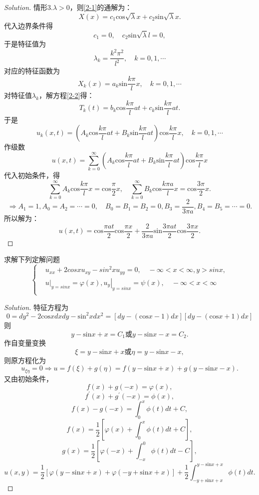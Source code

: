 \documentclass[cn,hazy,blue,14pt,screen]{elegantnote}
\begin{document}
\begin{example}
\begin{proof}[Solution]
		情形3.\quad $\lambda>0$，则\eqref{2-1}的通解为：
		$$X(x)=c_1\mathrm{cos}\sqrt{\lambda}x+c_2\mathrm{sin}\sqrt{\lambda}x.$$
		代入边界条件得
		$$c_1=0,\quad c_2\mathrm{sin}\sqrt{\lambda}l=0,$$
		于是特征值为
		$$\lambda_k=\frac{k^2\pi^2}{l^2},\quad k=0,1,\cdots$$
		对应的特征函数为
		$$X_k(x)=a_k\mathrm{sin}\frac{k\pi}{l} x,\quad k=0,1,\cdots$$
		对特征值$\lambda_k$，解方程\eqref{2-2}得：
		$$T_k(t)=b_k\mathrm{cos}\frac{k\pi}{l} at+c_k 
		\mathrm{sin}\frac{k\pi}{l} at.$$
		于是
		$$u_k(x,t)=\left(A_k\mathrm{cos}\frac{k\pi}{l} at
		+B_k\mathrm{sin}\frac{k\pi}{l} at\right)\mathrm{cos}\frac{k\pi}{l} 
		x,\quad k=0,1,\cdots$$
		作级数
		$$u(x,t)=\sum_{k=0}^{\infty}\left(A_k\mathrm{cos}\frac{k\pi}{l} at
		+B_k\mathrm{sin}\frac{k\pi}{l} at\right)\mathrm{cos}\frac{k\pi}{l} 
		x$$
		代入初始条件，得
		$$\sum_{k=0}^{\infty}A_k\mathrm{cos}\frac{k\pi}{l} 
		x=\mathrm{cos}\frac{\pi}{2}x,\quad \sum_{k=0}^{\infty}B_k\mathrm{cos}\frac{k\pi a}{l} x=\mathrm{cos}\frac{3\pi}{2}x.$$	
		$$\Rightarrow A_1=1,A_0=A_2=\cdots=0,\quad B_0=B_1=B_2=0,B_3=\frac{2}{3\pi 
			a},B_4=B_5=\cdots=0.$$
		所以解为：
		$$u(x,t)=\mathrm{cos}\frac{\pi at}{2}\mathrm{cos}\frac{\pi 
			x}{2}+\frac{2}{3\pi a}\mathrm{sin}\frac{3\pi at}{2}\mathrm{cos}\frac{3\pi 
			x}{2}.
		$$
	\end{proof}
	\end{example}
		
	\begin{example}
		求解下列定解问题
		\begin{equation*}
		\left\{\begin{aligned}
			&u_{xx}+2cosxu_{xy}-sin^{2}xu_{yy}=0, \quad -\infty<x<\infty, 
			y>sinx,  \\
			&\left.u\right|_{y=sinx}=\varphi(x), 
			\left.u_{y}\right|_{y=sinx}=\psi(x), \quad -\infty<x<\infty \\
		\end{aligned}\right.
		\end{equation*}
		\begin{proof}[Solution]
			特征方程为
			$$0=dy^2-2\mathrm{cos}xdxdy-\mathrm{sin}^2xdx^2
			=[dy-(\mathrm{cos}x-1)dx][dy-(\mathrm{cos}x+1)dx]$$
			则
			$$y-\mathrm{sin}x+x=C_1\text{或}y-\mathrm{sin}x-x=C_2.$$
			作自变量变换
			$$\xi=y-\mathrm{sin}x+x\text{或}\eta=y-\mathrm{sin}x-x,$$
			则原方程化为
			$$u_{\xi\eta}=0\Rightarrow 
			u=f(\xi)+g(\eta)=f(y-\mathrm{sin}x+x)+g(y-\mathrm{sin}x-x).$$
			又由初始条件，
			$$f(x)+g(-x)=\varphi(x),$$
			$$f^{\prime}(x)+g^{\prime}(-x)=\phi(x),$$
			$$f(x)-g(-x)=\int_{0}^{x}\phi(t)dt+C,$$
			$$f(x)=\frac{1}{2}[\varphi(x)+\int_{0}^{x}\phi(t)dt+C],$$
			$$g(x)=\frac{1}{2}[\varphi(-x)+\int_{-x}^{0}\phi(t)dt-C],$$
			$$u(x,y)=\frac{1}{2}[\varphi(y-\mathrm{sin}x+x)
			+\varphi(-y+\mathrm{sin}x+x)]+
			\frac{1}{2}\int_{-y+\mathrm{sin}x+x}^{y-\mathrm{sin}x+x}\phi(t)dt.$$
		\end{proof}
	\end{example}
		
\end{document}
